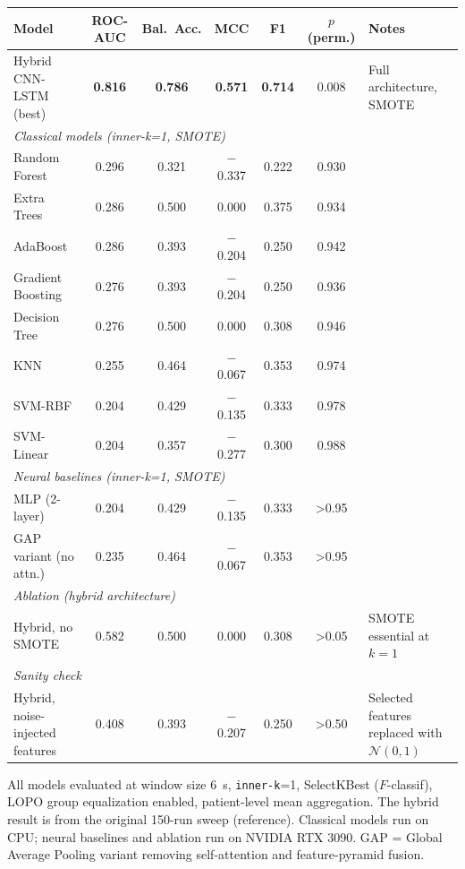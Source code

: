 \begin{tabular}{lcccccl}
\toprule
Model & ROC-AUC & Bal.\ Acc. & MCC & F1 & $p$ (perm.) & Notes \\
\midrule
Hybrid CNN-LSTM (best) & \textbf{0.816} & \textbf{0.786} & \textbf{0.571} & \textbf{0.714} & 0.008 & Full architecture, SMOTE \\
\midrule
\multicolumn{7}{l}{\textit{Classical models (inner-k=1, SMOTE)}} \\
Random Forest & 0.296 & 0.321 & $-$0.337 & 0.222 & 0.930 & \\
Extra Trees & 0.286 & 0.500 & 0.000 & 0.375 & 0.934 & \\
AdaBoost & 0.286 & 0.393 & $-$0.204 & 0.250 & 0.942 & \\
Gradient Boosting & 0.276 & 0.393 & $-$0.204 & 0.250 & 0.936 & \\
Decision Tree & 0.276 & 0.500 & 0.000 & 0.308 & 0.946 & \\
KNN & 0.255 & 0.464 & $-$0.067 & 0.353 & 0.974 & \\
SVM-RBF & 0.204 & 0.429 & $-$0.135 & 0.333 & 0.978 & \\
SVM-Linear & 0.204 & 0.357 & $-$0.277 & 0.300 & 0.988 & \\
\midrule
\multicolumn{7}{l}{\textit{Neural baselines (inner-k=1, SMOTE)}} \\
MLP (2-layer) & 0.204 & 0.429 & $-$0.135 & 0.333 & \textgreater{}0.95 & \\
GAP variant (no attn.) & 0.235 & 0.464 & $-$0.067 & 0.353 & \textgreater{}0.95 & \\
\midrule
\multicolumn{7}{l}{\textit{Ablation (hybrid architecture)}} \\
Hybrid, no SMOTE & 0.582 & 0.500 & 0.000 & 0.308 & \textgreater{}0.05 & SMOTE essential at $k{=}1$ \\
\midrule
\multicolumn{7}{l}{\textit{Sanity check}} \\
Hybrid, noise-injected features & 0.408 & 0.393 & $-$0.207 & 0.250 & \textgreater{}0.50 & Selected features replaced with $\mathcal{N}(0,1)$ \\
\bottomrule
\end{tabular}

\smallskip
\footnotesize All models evaluated at window size 6~s, \texttt{inner-k}=1, SelectKBest ($F$-classif), LOPO group equalization enabled, patient-level mean aggregation. The hybrid result is from the original 150-run sweep (reference). Classical models run on CPU; neural baselines and ablation run on NVIDIA RTX 3090. GAP = Global Average Pooling variant removing self-attention and feature-pyramid fusion.
